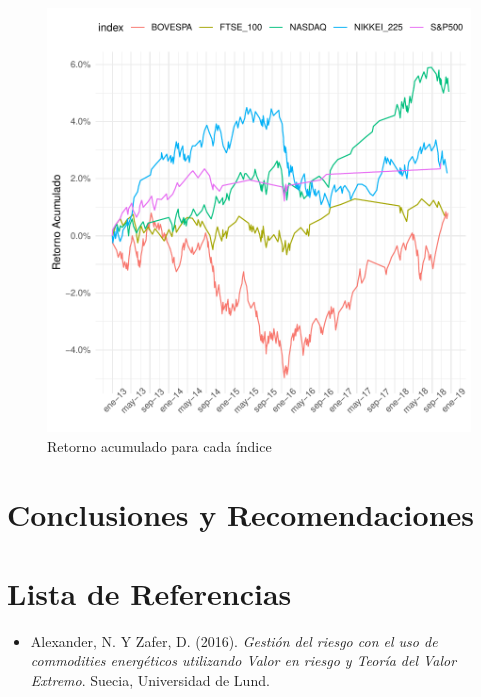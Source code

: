 \documentclass[a4paper,12pt]{Latex/Classes/PhDthesisPSnPDF}
\begin{document}
\begin{figure}[H]
\centering
\includegraphics{main-013}
\caption{Retorno acumulado para cada índice}
\end{figure}

\chapter*{Conclusiones y Recomendaciones}




\chapter*{Lista de Referencias}

\begin{itemize}

\item Alexander, N. Y Zafer, D. (2016). \textit{Gestión del riesgo con el uso de commodities energéticos utilizando Valor en riesgo y Teoría del Valor Extremo}. Suecia, Universidad de Lund.

\end{itemize}
\end{document}
